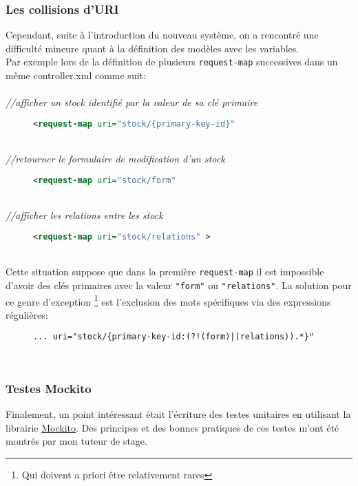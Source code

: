 \subsubsection{Les collisions d'URI}
Cependant, suite à l'introduction du nouveau système, on a rencontré une difficulté mineure quant à la définition des modèles avec les variables.\\
Par exemple lors de la définition de plusieurs \verb|request-map| successives dans un même controller.xml comme suit: \\
\\
\emph{//afficher un stock identifié par la valeur de sa clé primaire}
\begin{figure}[h!]
	\begin{lstlisting}[frame=leftline,language=xml]
<request-map uri="stock/{primary-key-id}" 
\end{lstlisting}
\end{figure}\\   
\emph{//retourner le formulaire de modification d'un stock}
\begin{figure}[h!]
	\begin{lstlisting}[frame=leftline,language=xml]
<request-map uri="stock/form" 
	\end{lstlisting}
\end{figure}\\
\emph{//afficher les relations entre les stock}
\begin{figure}[h!]
	\begin{lstlisting}[frame=leftline,language=xml]
<request-map uri="stock/relations" >
	\end{lstlisting}
\end{figure}  \\
Cette situation suppose que dans la première \verb|request-map| il est impossible d'avoir des clés primaires avec la valeur \verb|"form"| ou \verb|"relations"|. La solution pour ce genre d'exception \footnote{Qui doivent a priori être relativement rares} est l'exclusion des mots spécifiques via des expressions régulières: 
 \begin{figure}[h!]
 	\begin{lstlisting}[frame=leftline,language=xml,frameround=tttt]
... uri="stock/{primary-key-id:(?!(form)|(relations)).*}" 
 	\end{lstlisting}
 \end{figure}  \\


\subsubsection{Testes Mockito}
Finalement, un point intéressant était l'écriture des testes unitaires en utilisant la librairie \href{https://site.mockito.org/}{Mockito}. Des principes et des bonnes pratiques de ces testes m'ont été montrés par mon tuteur de stage. 
